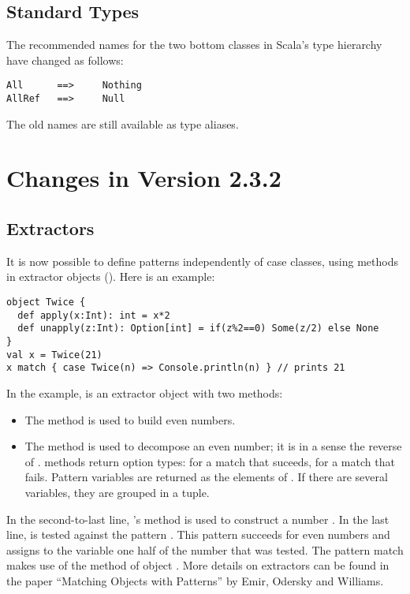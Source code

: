 \subsection*{Standard Types} 

The recommended names for the two bottom classes in Scala's type
hierarchy have changed as follows:
\begin{lstlisting}
All      ==>     Nothing
AllRef   ==>     Null
\end{lstlisting}
The old names are still available as type aliases.

\section{Changes in Version 2.3.2}

\subsection*{Extractors}

It is now possible to define patterns independently of case classes,
using  methods in extractor objects
(). 
Here is an example:
\begin{lstlisting}
object Twice {                              
  def apply(x:Int): int = x*2
  def unapply(z:Int): Option[int] = if(z%2==0) Some(z/2) else None
}
val x = Twice(21) 
x match { case Twice(n) => Console.println(n) } // prints 21
\end{lstlisting}
In the example, \lstinline@Twice@ is an extractor object with two methods:
\begin{itemize}
\item
The  method is used to build even numbers.
\item
The  method is used to decompose an even number; it is
in a sense the reverse of . \lstinline@unapply@ methods return option types: 
 for a match that suceeds,  for a match that fails.
Pattern variables are returned as the elements of . If there are several
variables, they are grouped in a tuple.
\end{itemize}
In the second-to-last line, 's  method is used
to construct a number . In the last line,  is tested
against the pattern
. This pattern succeeds for even numbers and assigns to the variable
 one half of the number that was tested. The pattern match makes use of
the  method of object . More details on extractors can be found
in the paper ``Matching Objects with Patterns'' by Emir, Odersky and Williams.
 
